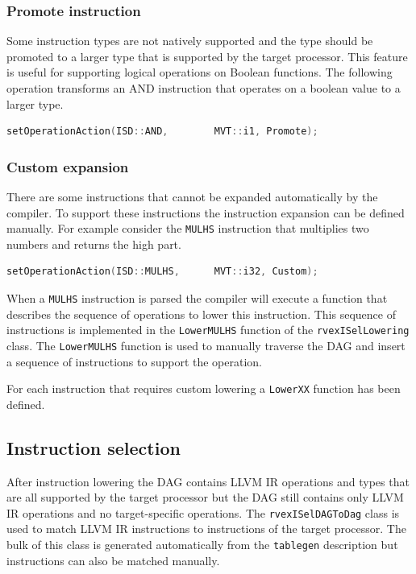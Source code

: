 \subsubsection{Promote instruction}
Some instruction types are not natively supported and the type should be promoted to a larger type that is supported by the target processor. This feature is useful for supporting logical operations on Boolean functions. The following operation transforms an AND instruction that operates on a boolean value to a larger type.

\begin{lstlisting}[language=c] 
setOperationAction(ISD::AND,        MVT::i1, Promote);
\end{lstlisting}

\subsubsection{Custom expansion}
There are some instructions that cannot be expanded automatically by the compiler. To support these instructions the instruction expansion can be defined manually. For example consider the \texttt{MULHS} instruction that multiplies two numbers and returns the high part.

\begin{lstlisting}[language=c] 
setOperationAction(ISD::MULHS,      MVT::i32, Custom);
\end{lstlisting}

When a \texttt{MULHS} instruction is parsed the compiler will execute a function that describes the sequence of operations to lower this instruction. This sequence of instructions is implemented in the \texttt{LowerMULHS} function of the \texttt{rvexISelLowering} class. The \texttt{LowerMULHS} function is used to manually traverse the DAG and insert a sequence of instructions to support the operation.

For each instruction that requires custom lowering a \texttt{LowerXX} function has been defined.

\subsection{Instruction selection}
After instruction lowering the DAG contains LLVM IR operations and types that are all supported by the target processor but the DAG still contains only LLVM IR operations and no target-specific operations. The \texttt{rvexISelDAGToDag} class is used to match LLVM IR instructions to instructions of the target processor. The bulk of this class is generated automatically from the \texttt{tablegen} description but instructions can also be matched manually.

